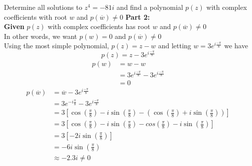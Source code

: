 \documentclass[a4paper, 8pt]{extarticle}
\begin{document}
\begin{examplebox}{Determine all solutions to $z^4 = -81i$ and find a polynomial $p(z)$ with complex coefficients with root $w$ and $p(\overline{w}) \neq 0$}{}
	\textbf{Part 2:} \\
	\textbf{Given} $p(z)$ with complex coefficients has root $w$ and $p(\overline{w}) \neq 0$ \\
	In other words, we want $p(w) = 0$ and $p(\overline{w}) \neq 0$ \\
	Using the most simple polynomial, $p(z) = z - w$ and letting $w = 3e^{i\frac{-\pi}{8}}$ we have
	$$p(z) = z - 3e^{i\frac{-\pi}{8}}$$
	\begin{align*}
		p(w) & = w - w                                       \\
		     & = 3e^{i\frac{-\pi}{8}} - 3e^{i\frac{-\pi}{8}} \\
		     & = 0
	\end{align*}
	\begin{align*}
		p(\overline{w}) & = \overline{w} - 3e^{i\frac{-\pi}{8}}                                                                                                                            \\
		                & = 3e^{-i\frac{\pi}{8}} - 3e^{i\frac{-\pi}{8}}                                                                                                                    \\
		                & = 3\left[\cos\left(\frac{\pi}{8}\right) - i\sin\left(\frac{\pi}{8}\right) - \left(\cos\left(\frac{\pi}{8}\right) + i\sin\left(\frac{\pi}{8}\right)\right)\right] \\
		                & = 3\left[\cos\left(\frac{\pi}{8}\right) - i\sin\left(\frac{\pi}{8}\right) - cos\left(\frac{\pi}{8}\right) - i\sin\left(\frac{\pi}{8}\right)\right]               \\
		                & = 3\left[-2i\sin\left(\frac{\pi}{8}\right)\right]                                                                                                                \\
		                & = -6i\sin\left(\frac{\pi}{8}\right)                                                                                                                              \\
		                & \approx -2.3i \neq 0
	\end{align*}
\end{examplebox}
\end{document}
